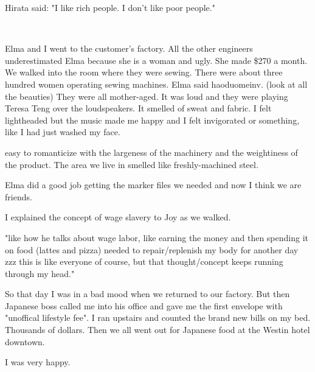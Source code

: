 Hirata said: "I like rich people. I don't like poor people."

~

Elma and I went to the customer's factory. All the other
engineers underestimated Elma because she is a woman and ugly. She made \$270 a
month. We walked into the room where they were sewing. There were about three
hundred women operating sewing machines. Elma said haoduomeinv.  (look at all the
beauties)  They were all mother-aged. It was loud and they were playing Teresa
Teng over the loudspeakers. It smelled of sweat and fabric. I felt lightheaded
but the music made me happy and I felt invigorated or something, like I had
just washed my face.

easy to romanticize with the largeness of the machinery and the weightiness of
the product. The area we live in smelled like freshly-machined steel.

Elma did a good job getting the marker files we needed and now I think we are
friends.

I explained the concept of wage slavery to Joy as we walked.

"like how he talks about wage labor, like earning the money and then spending
it on food (lattes and pizza) needed to repair/replenish my body for another
day zzz this is like everyone of course, but that thought/concept keeps running
through my head."

So that day I was in a bad mood when we returned to our factory. But then
Japanese boss called me into his office and gave me the first envelope with
"unoffical lifestyle fee". I ran upstairs and counted the brand new bills on my
bed.  Thousands of dollars.  Then we all went out for Japanese food at the
Westin hotel downtown.

I was very happy.
